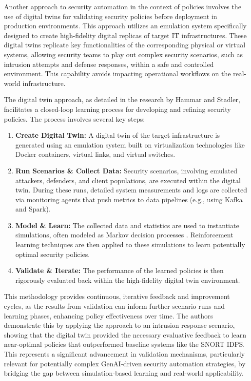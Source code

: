 Another approach to security automation in the context of policies involves the use of digital twins for validating security policies before deployment in production environments\cite{hammar_digital_2023}. This approach utilizes an emulation system specifically designed to create high-fidelity digital replicas of target IT infrastructures\cite{hammar_digital_2023}. These digital twins replicate key functionalities of the corresponding physical or virtual systems, allowing security teams to play out complex security scenarios, such as intrusion attempts and defense responses, within a safe and controlled environment\cite{hammar_digital_2023}. This capability avoids impacting operational workflows on the real-world infrastructure\cite{hammar_digital_2023}.

The digital twin approach, as detailed in the research by Hammar and Stadler, facilitates a closed-loop learning process for developing and refining security policies\cite{hammar_digital_2023}. The process involves several key steps:
\begin{enumerate} %
    \item \textbf{Create Digital Twin:} A digital twin of the target infrastructure is generated using an emulation system built on virtualization technologies like Docker containers, virtual links, and virtual switches\cite{hammar_digital_2023}.
    \item \textbf{Run Scenarios \& Collect Data:} Security scenarios, involving emulated attackers, defenders, and client populations, are executed within the digital twin\cite{hammar_digital_2023}. During these runs, detailed system measurements and logs are collected via monitoring agents that push metrics to data pipelines (e.g., using Kafka and Spark)\cite{hammar_digital_2023}.
    \item \textbf{Model \& Learn:} The collected data and statistics are used to instantiate simulations, often modeled as Markov decision processes \cite{hammar_digital_2023}. Reinforcement learning techniques are then applied to these simulations to learn potentially optimal security policies\cite{hammar_digital_2023}.
    \item \textbf{Validate \& Iterate:} The performance of the learned policies is then rigorously evaluated back within the high-fidelity digital twin environment\cite{hammar_digital_2023}.
\end{enumerate}

This methodology provides continuous, iterative feedback and improvement cycles, as the results from validation can inform further scenario runs and learning phases, enhancing policy effectiveness over time\cite{hammar_digital_2023}. The authors demonstrate this by applying the approach to an intrusion response scenario, showing that the digital twin provided the necessary evaluative feedback to learn near-optimal policies that outperformed baseline systems like the SNORT IDPS\cite{zhou_study_2010}. This represents a significant advancement in validation mechanisms, particularly relevant for potentially complex GenAI-driven security automation strategies, by bridging the gap between simulation-based learning and real-world applicability\cite{hammar_digital_2023}.

